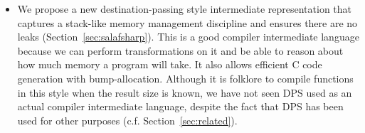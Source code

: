 \begin{itemize}

\item We propose a new destination-passing style intermediate representation that captures a stack-like memory management discipline and ensures there
are no leaks (Section~\ref{sec:salafsharp}). This is a good compiler intermediate language because we can perform transformations on it and be able to reason about how much
memory a program will take. It also allows efficient C code generation with bump-allocation. Although it is folklore to compile functions
in this style when the result size is known, we have not seen DPS used as an actual compiler intermediate language, despite the fact that DPS has been used for other purposes (c.f. Section~\ref{sec:related}).
 

\end{itemize}

